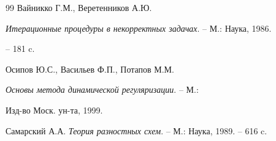 \begin{thebibliography}{99}
Вайникко Г.М., Веретенников А.Ю.


{\it Итерационные процедуры в некорректных задачах}. -- М.: Наука, 1986.


-- 181 c.







Осипов Ю.С.,  Васильев Ф.П., Потапов М.М.


{\it Основы метода динамической регуляризации}. -- М.: 


Изд-во Моск. ун-та,  1999.







Самарский А.А. {\it Теория разностных схем}. --  М.: Наука, 1989. -- 616 c.





\end{thebibliography}





\vskip 2cm














\label{end}





